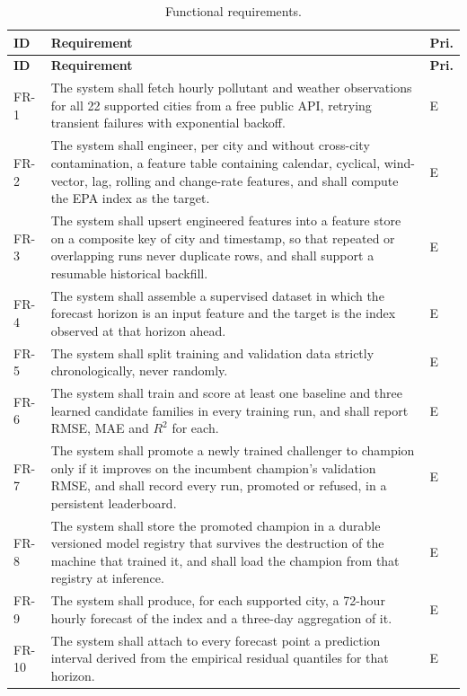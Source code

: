 \begin{xltabular}{\textwidth}{Q{1.5cm} Y Q{1.1cm}}
\caption{Functional requirements.}\label{tab:fr}\\
\toprule
\bfseries ID & \bfseries Requirement & \bfseries Pri. \\
\midrule
\endfirsthead
\toprule
\bfseries ID & \bfseries Requirement & \bfseries Pri. \\
\midrule
\endhead
\bottomrule
\endlastfoot
FR-1 & The system shall fetch hourly pollutant and weather observations for all
22 supported cities from a free public API, retrying transient failures with
exponential backoff. & E \\
FR-2 & The system shall engineer, per city and without cross-city contamination,
a feature table containing calendar, cyclical, wind-vector, lag, rolling and
change-rate features, and shall compute the EPA index as the target. & E \\
FR-3 & The system shall upsert engineered features into a feature store on a
composite key of city and timestamp, so that repeated or overlapping runs never
duplicate rows, and shall support a resumable historical backfill. & E \\
FR-4 & The system shall assemble a supervised dataset in which the forecast
horizon is an input feature and the target is the index observed at that horizon
ahead. & E \\
FR-5 & The system shall split training and validation data strictly
chronologically, never randomly. & E \\
FR-6 & The system shall train and score at least one baseline and three learned
candidate families in every training run, and shall report RMSE, MAE and $R^2$
for each. & E \\
FR-7 & The system shall promote a newly trained challenger to champion only if
it improves on the incumbent champion's validation RMSE, and shall record every
run, promoted or refused, in a persistent leaderboard. & E \\
FR-8 & The system shall store the promoted champion in a durable versioned model
registry that survives the destruction of the machine that trained it, and shall
load the champion from that registry at inference. & E \\
FR-9 & The system shall produce, for each supported city, a 72-hour hourly
forecast of the index and a three-day aggregation of it. & E \\
FR-10 & The system shall attach to every forecast point a prediction interval
derived from the empirical residual quantiles for that horizon. & E \\

\end{xltabular}
